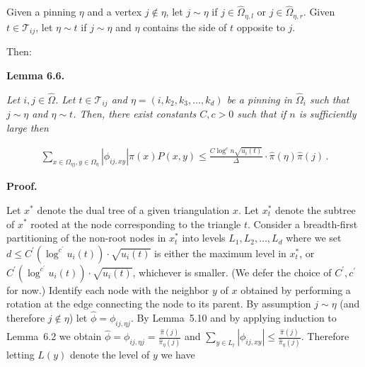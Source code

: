 Given a pinning $\eta$ and a vertex $j\notin\eta$, let $j\sim\eta$ if $j\in\hat{\Omega}_{\eta,l}$ or $j\in\hat{\Omega}_{\eta,r}$. Given $t\in\mathcal{T}_{ij}$, let $\eta\sim t$ if $j\sim\eta$ and $\eta$ contains the side of $t$ opposite to $j$.\par




Then:\par





\par\medskip\noindent\textbf{\textbf{Lemma 6.6}\textbf{.}}\par



\emph{Let $i,j\in\hat{\Omega}$. Let $t\in\mathcal{T}_{ij}$ and $\eta=(i,k_{2},k_{3},\dots,k_{d})$ be a pinning in $\hat{\Omega}_{i}$ such that $j\sim\eta$ and $\eta\sim t$. Then, there exist constants $C,c>0$ such that if $n$ is sufficiently large then}\par




\[\begin{gathered}
\sum_{x\in\Omega_{\eta j},y\in\Omega_{\eta}}|\phi_{ij,xy}|\pi(x)P(x,y)\leq\frac{C\log^{c}n\sqrt{u_{i}(t)}}{\Delta}\cdot\hat{\pi}(\eta)\hat{\pi}(j)\,.
\end{gathered}\]






\par\medskip\noindent\textbf{Proof.}\par



Let $x^{*}$ denote the dual tree of a given triangulation $x$. Let $x_{t}^{*}$ denote the subtree of $x^{*}$ rooted at the node corresponding to the triangle $t$. Consider a breadth-first partitioning of the non-root nodes in $x_{t}^{*}$ into levels $L_{1},L_{2},\dots,L_{d}$ where we set $d\leq C^{\prime}(\log^{c^{\prime}}u_{i}(t))\cdot\sqrt{u_{i}(t)}$ is either the maximum level in $x_{t}^{*}$, or $C^{\prime}(\log^{c^{\prime}}u_{i}(t))\cdot\sqrt{u_{i}(t)}$, whichever is smaller. (We defer the choice of $C^{\prime},c^{\prime}$ for now.) Identify each node with the neighbor $y$ of $x$ obtained by performing a rotation at the edge connecting the node to its parent. By assumption $j\sim\eta$ (and therefore $j\notin\eta$) let $\hat{\phi}=\phi_{ij,\eta j}$. By Lemma 5.10 and by applying induction to Lemma 6.2 we obtain $\hat{\phi}=\phi_{ij,\eta j}=\frac{\hat{\pi}(j)}{\hat{\pi}_{\eta}(j)}$ and $\sum_{y\in L_{t}}|\phi_{ij,xy}|\leq\frac{\hat{\pi}(j)}{\hat{\pi}_{\eta}(j)}$. Therefore letting $L(y)$ denote the level of $y$ we have\par


